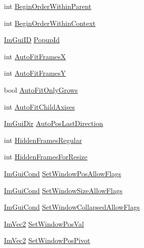 \begin{DoxyCompactItemize}
int \mbox{\hyperlink{struct_im_gui_window_a9299370fd06dff8c36988743db5b90fd}{Begin\+Order\+Within\+Parent}}
\item 
int \mbox{\hyperlink{struct_im_gui_window_ae0cb2f2346c1a9264210626a99997506}{Begin\+Order\+Within\+Context}}
\item 
\mbox{\hyperlink{imgui_8h_a1785c9b6f4e16406764a85f32582236f}{Im\+Gui\+ID}} \mbox{\hyperlink{struct_im_gui_window_a319c5f43fa4ee9c76b8a6e551e0c0869}{Popup\+Id}}
\item 
int \mbox{\hyperlink{struct_im_gui_window_a4ec83127718940ff4e0e268dc45232cf}{Auto\+Fit\+FramesX}}
\item 
int \mbox{\hyperlink{struct_im_gui_window_a081b945f503a33c5fc686ff2ea9985f0}{Auto\+Fit\+FramesY}}
\item 
bool \mbox{\hyperlink{struct_im_gui_window_a3583d20a57fea8c8491f14f2dcda483c}{Auto\+Fit\+Only\+Grows}}
\item 
int \mbox{\hyperlink{struct_im_gui_window_ad323df685c026a4557912a5090414abe}{Auto\+Fit\+Child\+Axises}}
\item 
\mbox{\hyperlink{imgui_8h_a874086389bc27cc9647118d22a806403}{Im\+Gui\+Dir}} \mbox{\hyperlink{struct_im_gui_window_aa8219e984ed273d6cfd19fb4b93eff5e}{Auto\+Pos\+Last\+Direction}}
\item 
int \mbox{\hyperlink{struct_im_gui_window_a39c81a7b9b0a3c9e31384dce9d007125}{Hidden\+Frames\+Regular}}
\item 
int \mbox{\hyperlink{struct_im_gui_window_a57a311561f3516d826be239d5aa8f4cf}{Hidden\+Frames\+For\+Resize}}
\item 
\mbox{\hyperlink{imgui_8h_aef890d6ac872e12c5804d0b3e4f7f103}{Im\+Gui\+Cond}} \mbox{\hyperlink{struct_im_gui_window_a8ff69a8bdc9221c9cc7d8ba656013d84}{Set\+Window\+Pos\+Allow\+Flags}}
\item 
\mbox{\hyperlink{imgui_8h_aef890d6ac872e12c5804d0b3e4f7f103}{Im\+Gui\+Cond}} \mbox{\hyperlink{struct_im_gui_window_a0c9419d95253214cb2a71d6ead1e03d6}{Set\+Window\+Size\+Allow\+Flags}}
\item 
\mbox{\hyperlink{imgui_8h_aef890d6ac872e12c5804d0b3e4f7f103}{Im\+Gui\+Cond}} \mbox{\hyperlink{struct_im_gui_window_a48384a3767252325e5c71b534adc58a9}{Set\+Window\+Collapsed\+Allow\+Flags}}
\item 
\mbox{\hyperlink{struct_im_vec2}{Im\+Vec2}} \mbox{\hyperlink{struct_im_gui_window_a6caed47ef8e25a2e7a68a6be72c5716a}{Set\+Window\+Pos\+Val}}
\item 
\mbox{\hyperlink{struct_im_vec2}{Im\+Vec2}} \mbox{\hyperlink{struct_im_gui_window_a4de5608bf44728447327d832fa84f0c9}{Set\+Window\+Pos\+Pivot}}

\end{DoxyCompactItemize}

